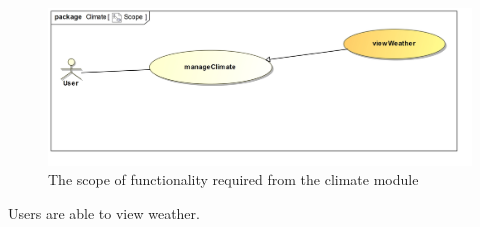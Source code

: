 
\begin{figure}[H]
	\centering
	\includegraphics[scale=0.24]{../images/funcReq/ClimateScope.jpg}
	\caption{The scope of functionality required from the climate module \label{overflow}}
\end{figure} Users are able to view weather.